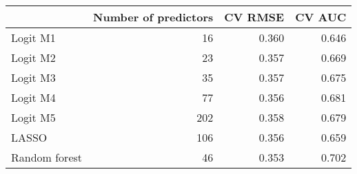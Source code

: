 
\begin{tabular}{lrrr}
\toprule
  & Number of predictors & CV RMSE & CV AUC\\
\midrule
Logit M1 & 16 & 0.360 & 0.646\\
Logit M2 & 23 & 0.357 & 0.669\\
Logit M3 & 35 & 0.357 & 0.675\\
Logit M4 & 77 & 0.356 & 0.681\\
Logit M5 & 202 & 0.358 & 0.679\\
LASSO & 106 & 0.356 & 0.659\\
Random forest & 46 & 0.353 & 0.702\\
\bottomrule
\end{tabular}